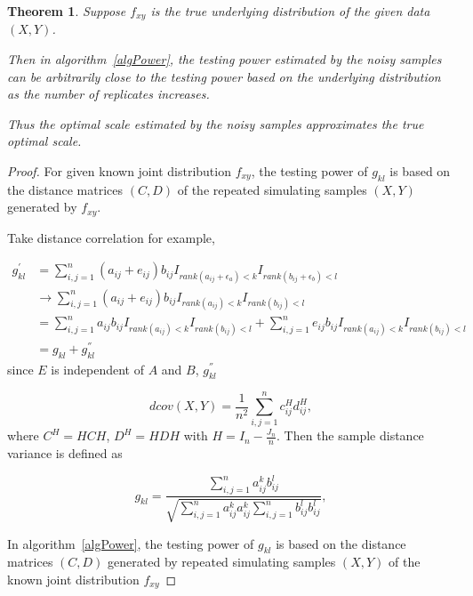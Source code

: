 \documentclass[11pt]{article}
\newtheorem{thm}{Theorem}
\begin{document}
\begin{thm}
Suppose $f_{xy}$ is the true underlying distribution of the given data $(X,Y)$.

Then in algorithm~\ref{algPower}, the testing power estimated by the noisy samples can be arbitrarily close to the testing power based on the underlying distribution as the number of replicates increases.

Thus the optimal scale estimated by the noisy samples approximates the true optimal scale.
\end{thm}
\begin{proof}
For given known joint distribution $f_{xy}$, the testing power of $g_{kl}$ is based on the distance matrices $(C,D)$ of the repeated simulating samples $(X,Y)$ generated by $f_{xy}$. 

Take distance correlation for example, 

\begin{align*}
\label{localCoef}
g_{kl}^{'} &= \sum_{i,j=1}^n (a_{ij}+e_{ij}) b_{ij} I_{rank(a_{ij}+\epsilon_{a})<k} I_{rank(b_{ij}+\epsilon_{b})<l}  \\
& \rightarrow \sum_{i,j=1}^n (a_{ij}+e_{ij}) b_{ij} I_{rank(a_{ij})<k} I_{rank(b_{ij})<l}  \\
& = \sum_{i,j=1}^n a_{ij}b_{ij} I_{rank(a_{ij})<k} I_{rank(b_{ij})<l}  + \sum_{i,j=1}^n e_{ij}b_{ij} I_{rank(a_{ij})<k} I_{rank(b_{ij})<l}  \\
& = g_{kl} + g_{kl}^{''}
\end{align*}
since $E$ is independent of $A$ and $B$, $g_{kl}^{''}$


\begin{equation}
\label{dcovEqu}
dcov(X,Y)=\frac{1}{n^2}\sum_{i,j=1}^{n}c^{H}_{ij}d^{H}_{ij},
\end{equation}
where $C^{H}=HCH$, $D^{H}=HDH$ with $H=I_{n}-\frac{J_{n}}{n}$. Then the sample distance variance is defined as


\begin{equation}
\label{localCoef}
g_{kl}=\frac{\sum_{i,j=1}^n a_{ij}^k b_{ij}^l}{\sqrt{\sum_{i,j=1}^n  a_{ij}^{k} a_{ij}^{k} \sum_{i,j=1}^n b_{ij}^{l} b_{ij}^{l}}},
\end{equation}


In algorithm~\ref{algPower}, the testing power of $g_{kl}$ is based on the distance matrices $(C,D)$ generated by repeated simulating samples $(X,Y)$ of the known joint distribution $f_{xy}$


\end{proof}




\end{document}
